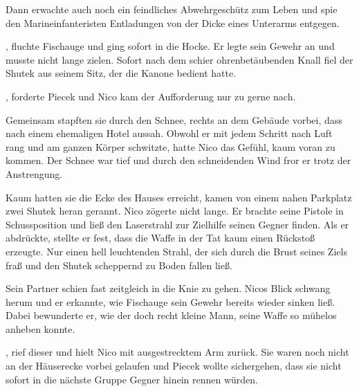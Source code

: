 Dann erwachte auch noch ein feindliches Abwehrgeschütz zum Leben und spie den Marineinfanteristen Entladungen von der Dicke eines Unterarms entgegen.

\par

, fluchte Fischauge und ging sofort in die Hocke.  Er legte sein Gewehr an und musste nicht lange zielen. Sofort nach dem schier ohrenbetäubenden Knall fiel der Shutek aus seinem Sitz, der die Kanone bedient hatte.

\par

, forderte Piecek und Nico kam der Aufforderung nur zu gerne nach.

\par

Gemeinsam stapften sie durch den Schnee, rechts an dem Gebäude vorbei, dass nach einem ehemaligen Hotel aussah. Obwohl er mit jedem Schritt nach Luft rang und am ganzen Körper schwitzte, hatte Nico das Gefühl, kaum voran zu kommen. Der Schnee war tief und durch den schneidenden Wind fror er trotz der Anstrengung.

\par

Kaum hatten sie die Ecke des Hauses erreicht, kamen von einem nahen Parkplatz zwei Shutek heran gerannt. Nico zögerte nicht lange. Er brachte seine Pistole in Schussposition und ließ den Laserstrahl zur Zielhilfe seinen Gegner finden. Als er abdrückte, stellte er fest, dass die Waffe in der Tat kaum einen Rückstoß erzeugte. Nur einen hell leuchtenden Strahl, der sich durch die Brust seines Ziels fraß und den Shutek scheppernd zu Boden fallen ließ.

\par

Sein Partner schien fast zeitgleich in die Knie zu gehen. Nicos Blick schwang herum und er erkannte, wie Fischauge sein Gewehr bereits wieder sinken ließ. Dabei bewunderte er, wie der doch recht kleine Mann, seine Waffe so mühelos anheben konnte.

\par

, rief dieser und hielt Nico mit ausgestrecktem Arm zurück. Sie waren noch nicht an der Häuserecke vorbei gelaufen und Piecek wollte sichergehen, dass sie nicht sofort in die nächste Gruppe Gegner hinein rennen würden.

\par

